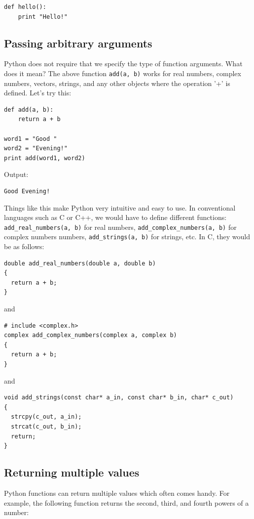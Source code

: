 \begin{verbatim}
def hello():
    print "Hello!"
\end{verbatim}

\subsection{Passing arbitrary arguments}

Python does not require that we specify the type of function arguments. 
What does it mean? The above function {\tt add(a, b)} works for real
numbers, complex numbers, vectors, strings, and any other 
objects where the operation '+' is defined. Let's try this:

\begin{verbatim}
def add(a, b):
    return a + b

word1 = "Good "
word2 = "Evening!"
print add(word1, word2)
\end{verbatim}
Output:

\begin{verbatim}
Good Evening!
\end{verbatim}
Things like this make Python very intuitive and easy to use. In conventional languages such as C or C++, 
we would have to define different functions: {\tt add\_real\_numbers(a, b)} for real numbers,
{\tt add\_complex\_numbers(a, b)} for complex numbers numbers, {\tt add\_strings(a, b)} for strings, etc. 
In C, they would be as follows:

\begin{verbatim}
double add_real_numbers(double a, double b)
{
  return a + b;
}
\end{verbatim}
and

\begin{verbatim}
# include <complex.h>
complex add_complex_numbers(complex a, complex b)
{
  return a + b;
}
\end{verbatim}
and 

\begin{verbatim}
void add_strings(const char* a_in, const char* b_in, char* c_out)
{
  strcpy(c_out, a_in);
  strcat(c_out, b_in);
  return;
}
\end{verbatim}

\subsection{Returning multiple values}

Python functions can return multiple values which often comes handy.
For example, the following function returns the 
second, third, and fourth powers of a number:

